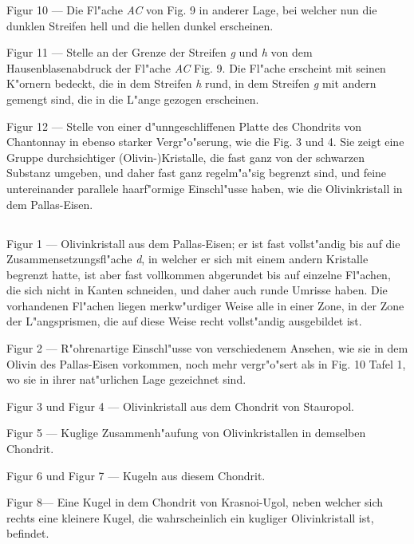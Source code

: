 \documentclass[a4paper, 11pt, oneside]{article}
\begin{document}
Figur 10 --- Die Fl"ache \emph{AC} von Fig. 9 in anderer Lage, bei welcher nun die dunklen Streifen hell und die hellen dunkel erscheinen.

Figur 11 --- Stelle an der Grenze der Streifen \emph{g} und \emph{h} von dem Hausenblasenabdruck der Fl"ache \emph{AC} Fig. 9. Die Fl"ache erscheint mit seinen K"ornern bedeckt, die in dem Streifen \emph{h} rund, in dem Streifen \emph{g} mit andern gemengt sind, die in die L"ange gezogen erscheinen.

Figur 12 --- Stelle von einer d"unngeschliffenen Platte des Chondrits von Chantonnay in ebenso starker Vergr"o"serung, wie die Fig. 3 und 4. Sie zeigt eine Gruppe durchsichtiger (Olivin-)Kristalle, die fast ganz von der schwarzen Substanz umgeben, und daher fast ganz regelm"a"sig begrenzt sind, und feine untereinander parallele haarf"ormige Einschl"usse haben, wie die Olivinkristall in dem Pallas-Eisen.

\subsection{}
\paragraph{}
Figur 1 --- Olivinkristall aus dem Pallas-Eisen; er ist fast vollst"andig bis auf die Zusammensetzungsfl"ache \emph{d}, in welcher er sich mit einem andern Kristalle begrenzt hatte, ist aber fast vollkommen abgerundet bis auf einzelne Fl"achen, die sich nicht in Kanten schneiden, und daher auch runde Umrisse haben. Die vorhandenen Fl"achen liegen merkw"urdiger Weise alle in einer Zone, in der Zone der L"angsprismen, die auf diese Weise recht vollst"andig ausgebildet ist.

Figur 2 --- R"ohrenartige Einschl"usse von verschiedenem Ansehen, wie sie in dem Olivin des Pallas-Eisen vorkommen, noch mehr vergr"o"sert als in Fig. 10 Tafel 1, wo sie in ihrer nat"urlichen Lage gezeichnet sind.

Figur 3 und Figur 4 --- Olivinkristall aus dem Chondrit von Stauropol.

Figur 5 --- Kuglige Zusammenh"aufung von Olivinkristallen in demselben Chondrit.

Figur 6 und Figur 7 --- Kugeln aus diesem Chondrit.

Figur 8--- Eine Kugel in dem Chondrit von Krasnoi-Ugol, neben welcher sich rechts eine kleinere Kugel, die wahrscheinlich ein kugliger Olivinkristall ist, befindet.
\end{document}
